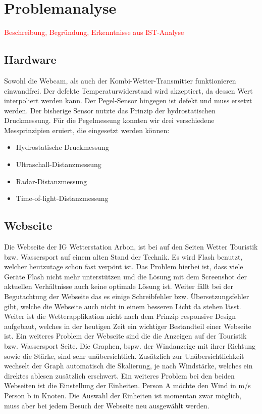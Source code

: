 \documentclass[a4paper,ngerman, 11pt, pagesize]{report}
\newcommand\Diskussionspunkt[1]{\textcolor{red}{#1}}
\begin{document}
\section{Problemanalyse}
\Diskussionspunkt{Beschreibung, 
Begründung, 
Erkenntnisse aus IST-Analyse}

\subsection{Hardware}
Sowohl die Webcam, als auch der Kombi-Wetter-Transmitter funktionieren einwandfrei. Der defekte Temperaturwiderstand wird akzeptiert, da dessen Wert interpoliert werden kann. Der Pegel-Sensor hingegen ist defekt und muss ersetzt werden. Der bisherige Sensor nutzte das Prinzip der hydrostatischen Druckmessung. Für die Pegelmessung konnten wir drei verschiedene Messprinzipien eruiert, die eingesetzt werden können:

\begin{itemize}  
\item Hydrostatische Druckmessung
\item Ultraschall-Distanzmessung
\item Radar-Distanzmessung
\item Time-of-light-Distanzmessung
\end{itemize}

\subsection{Webseite}
Die Webseite der IG Wetterstation Arbon, ist bei auf den Seiten Wetter Touristik bzw. Wassersport auf einem alten Stand der Technik. Es wird Flash benutzt, welcher heutzutage schon fast verpönt ist. Das Problem hierbei ist, dass viele Geräte Flash nicht mehr unterstützen und die Lösung mit dem Screenshot der aktuellen Verhältnisse auch keine optimale Lösung ist. Weiter fällt bei der Begutachtung der Webseite das es einige Schreibfehler bzw. Übersetzungsfehler gibt, welche die Webseite auch nicht in einem besseren Licht da stehen lässt. Weiter ist die Wetterapplikation nicht nach dem Prinzip responsive Design aufgebaut, welches in der heutigen Zeit ein wichtiger Bestandteil einer Webseite ist. Ein weiteres Problem der Webseite sind die die Anzeigen auf der Touristik bzw. Wassersport Seite. Die Graphen, bspw. der Windanzeige mit ihrer Richtung sowie die Stärke, sind sehr unübersichtlich. Zusätzlich zur Unübersichtlichkeit wechselt der Graph automatisch die Skalierung, je nach Windstärke, welches ein direktes ablesen zusätzlich erschwert. Ein weiteres Problem bei den beiden Webseiten ist die Einstellung der Einheiten. Person A möchte den Wind in m/s Person b in Knoten. Die Auswahl der Einheiten ist momentan zwar möglich, muss aber bei jedem Besuch der Webseite neu ausgewählt werden.
\end{document}
